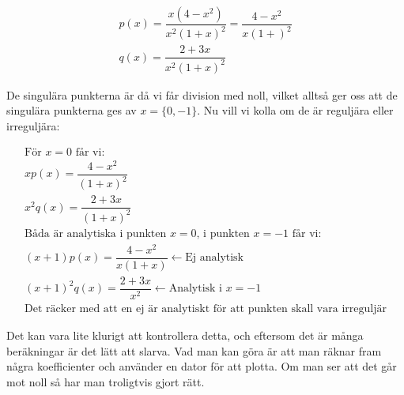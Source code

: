 \begin{equation*}
  \begin{gathered}
    p(x) = \dfrac{x(4-x^2)}{x^2(1+x)^2} = \dfrac{4-x^2}{x(1+)^2}\\
    q(x) = \dfrac{2+3x}{x^2(1+x)^2}
  \end{gathered}
\end{equation*}
\par\bigskip
\noindent De singulära punkterna är då vi får division med noll, vilket alltså ger oss att de singulära punkterna ges av $x = \{0,-1\}$. Nu vill vi kolla om de är reguljära eller irreguljära:

\begin{equation*}
  \begin{gathered}
    \text{För $x=0$ får vi: }\\
    xp(x) = \dfrac{4-x^2}{(1+x)^2}\\
    x^2q(x) = \dfrac{2+3x}{(1+x)^2}\\
    \text{Båda är analytiska i punkten $x=0$, i punkten $x=-1$ får vi: }\\
    (x+1)p(x) = \dfrac{4-x^2}{x(1+x)}\leftarrow\text{Ej analytisk}\\
    (x+1)^2q(x) = \dfrac{2+3x}{x^2} \leftarrow \text{Analytisk i $x=-1$}\\
    \text{Det räcker med att en ej är analytiskt för att punkten skall vara irreguljär}
  \end{gathered}
\end{equation*}
\par\bigskip
\noindent Det kan vara lite klurigt att kontrollera detta, och eftersom det är många beräkningar är det lätt att slarva. Vad man kan göra är att man räknar fram några koefficienter och använder en dator för att plotta. Om man ser att det går mot noll så har man troligtvis gjort rätt. 





